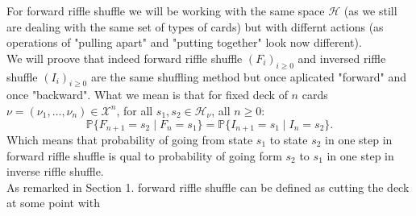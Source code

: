 \documentclass[a4paper, 12pt]{report}
\begin{document}
For forward riffle shuffle we will be working with the same space $\mathcal{H}$ (as we still
are dealing with the same set of types of cards) but with differnt actions (as operations of "pulling apart"
and "putting together" look now different). \\
We will proove that indeed forward riffle shuffle $(F_i)_{i \geq 0}$ and inversed riffle shuffle
$(I_i)_{i \geq 0}$ are the same shuffling method
but once aplicated "forward" and once "backward". What we mean is that for fixed deck of $n$ cards
$\nu = (\nu_1, \dots, \nu_n) \in \mathcal{X}^n$, for all $s_1, s_2 \in \mathcal{H}_\nu$, all $n \geq 0$:
\begin{equation*}
\mathbb{P}\{F_{n+1} = s_2 \mid F_n = s_1\} = \mathbb{P}\{I_{n+1} = s_1 \mid I_n = s_2\}.
\end{equation*}
Which means that probability of going from state $s_1$ to state $s_2$ in one step in forward riffle shuffle
is qual to probability of going form $s_2$ to $s_1$ in one step in  inverse riffle shuffle. \\
As remarked in Section 1. forward riffle shuffle can be defined as cutting the deck at some point with
\end{document}
